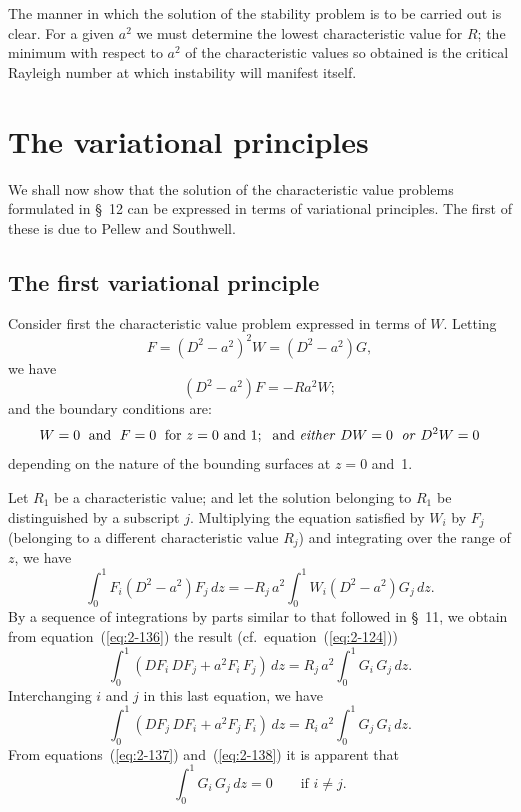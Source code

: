 The manner in which the solution of the stability problem is to be
carried out is clear. For a given $a^2$ we must determine the lowest characteristic value for $R$; the minimum with respect to $a^2$ of the characteristic
values so obtained is the critical Rayleigh number at which instability
will manifest itself.

\section{The variational principles}\label{sec:13}

We shall now show that the solution of the characteristic value
problems formulated in \S~12 can be expressed in terms of variational
principles. The first of these is due to Pellew and Southwell.

\subsection{The first variational principle}\label{sec:13a}

Consider first the characteristic value problem expressed in terms
of $W$. Letting
\begin{equation}
\label{eq:2-133}
F = (D^2-a^2)^2 W = (D^2-a^2)G,
\end{equation}
we have
\begin{equation}
\label{eq:2-134}
(D^2-a^2)F = -Ra^2 W;
\end{equation}
and the boundary conditions are:
\begin{equation}
\label{eq:2-135}
W = 0 \;\text{ and }\; F = 0 \;\text{ for } z = 0 \text{ and } 1; \;\text{ and \emph{either} } DW = 0 \;\text{ \emph{or} } D^2W = 0
\end{equation}
depending on the nature of the bounding surfaces at $z = 0$ and~1.

Let $R_1$ be a characteristic value; and let the solution belonging to $R_1$
be distinguished by a subscript $j$. Multiplying the equation satisfied by
$W_i$ by $F_j$ (belonging to a different characteristic value $R_j$) and integrating over the range of $z$, we have
\begin{equation}
\label{eq:2-136}
\int_0^1 F_i(D^2-a^2)F_j\,dz = -R_j\,a^2\!\int_0^1 W_i(D^2-a^2)G_j\,dz.
\end{equation}
By a sequence of integrations by parts similar to that followed in \S~11,
we obtain from equation~(\ref{eq:2-136}) the result (cf.\ equation~(\ref{eq:2-124}))
\begin{equation}
\label{eq:2-137}
\int_0^1(DF_i\,DF_j+a^2 F_i\,F_j)\,dz = R_j\,a^2\!\int_0^1 G_i\,G_j\,dz.
\end{equation}
Interchanging $i$ and $j$ in this last equation, we have
\begin{equation}
\label{eq:2-138}
\int_0^1(DF_j\,DF_i+a^2 F_j\,F_i)\,dz = R_i\,a^2\!\int_0^1 G_j\,G_i\,dz.
\end{equation}
From equations~(\ref{eq:2-137}) and~(\ref{eq:2-138}) it is apparent that
\begin{equation}
\label{eq:2-139}
\int_0^1 G_i\,G_j\,dz = 0 \qquad\text{if } i \neq j.
\end{equation}

